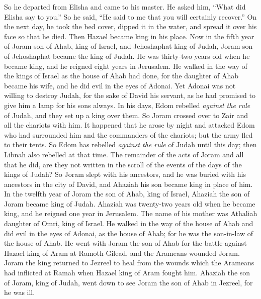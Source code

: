 \begin{biblechapter}
\verse So he departed from Elisha and came to his master. He asked him, “What did Elisha say to you.” So he said, “He said to me that you will certainly recover.”
\verse On the next day, he took the bed cover, dipped it in the water, and spread it over his face so that he died. Then Hazael became king in his place.
 Now in the fifth year of Joram son of Ahab, king of Israel, and Jehoshaphat king of Judah, Joram son of Jehoshaphat became the king of Judah.
\verse He was thirty-two years old when he became king, and he reigned eight years in Jerusalem.
\verse He walked in the way of the kings of Israel as the house of Ahab had done, for the daughter of Ahab became his wife, and he did evil in the eyes of Adonai.
\verse Yet Adonai was not willing to destroy Judah, for the sake of David his servant, as he had promised to give him a lamp for his sons always.
\verse In his days, Edom rebelled \textit{against the rule} of Judah, and they set up a king over them.
\verse So Joram crossed over to Zair and all the chariots with him. It happened that he arose by night and attacked Edom who had surrounded him and the commanders of the chariots; but the army fled to their tents.
\verse So Edom has rebelled \textit{against the rule} of Judah until this day; then Libnah also rebelled at that time.
\verse The remainder of the acts of Joram and all that he did, are they not written in the scroll of the events of the days of the kings of Judah?
\verse So Joram slept with his ancestors, and he was buried with his ancestors in the city of David, and Ahaziah his son became king in place of him.
 In the twelfth year of Joram the son of Ahab, king of Israel, Ahaziah the son of Joram became king of Judah.
\verse Ahaziah was twenty-two years old when he became king, and he reigned one year in Jerusalem. The name of his mother was Athaliah daughter of Omri, king of Israel.
\verse He walked in the way of the house of Ahab and did evil in the eyes of Adonai, as the house of Ahab; for he was the son-in-law of the house of Ahab.
\verse He went with Joram the son of Ahab for the battle against Hazael king of Aram at Ramoth-Gilead, and the Arameans wounded Joram.
\verse Joram the king returned to Jezreel to heal from the wounds which the Arameans had inflicted at Ramah when Hazael king of Aram fought him. Ahaziah the son of Joram, king of Judah, went down to see Joram the son of Ahab in Jezreel, for he was ill.
\end{biblechapter}

